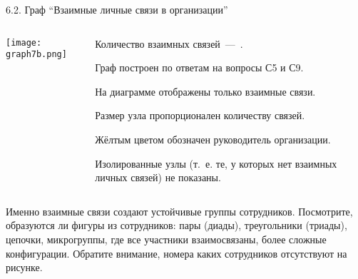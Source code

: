 \begin{frame}{6.2. Граф ``Взаимные личные связи в организации''}

\begin{columns}
\begin{column}{0.7\textwidth} 
\centering
          \texttt{[image: graph7b.png]}
\end{column}
\begin{column}{0.3\textwidth} 
\tiny

Количество взаимных связей~---~\valGBlinks.
\smallskip

Граф построен по ответам на вопросы С5 и С9.
\smallskip

\socioSizeComment
\smallskip

На диаграмме отображены только взаимные связи.
\smallskip

Размер узла пропорционален количеству связей.
\smallskip

Жёлтым цветом обозначен руководитель организации.
\smallskip

Изолированные узлы (т.~е. те, у которых нет взаимных личных связей) не показаны.


\end{column}
\end{columns}

\fontsize{6pt}{7}\selectfont
Именно взаимные связи создают устойчивые группы сотрудников. Посмотрите, образуются ли фигуры из сотрудников: 
пары (диады), треугольники (триады), цепочки, микрогруппы, где все участники взаимосвязаны, более сложные конфигурации.
Обратите внимание, номера каких сотрудников отсутствуют на рисунке. 


\end{frame}


